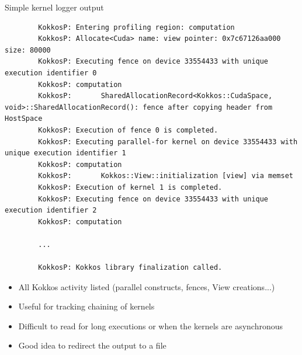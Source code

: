\documentclass[
    aspectratio=169,
]{beamer}
\begin{document}
\begin{frame}[fragile]{Simple kernel logger output}
    \begin{verbatim}
        KokkosP: Entering profiling region: computation
        KokkosP: Allocate<Cuda> name: view pointer: 0x7c67126aa000 size: 80000
        KokkosP: Executing fence on device 33554433 with unique execution identifier 0
        KokkosP: computation
        KokkosP:       SharedAllocationRecord<Kokkos::CudaSpace, void>::SharedAllocationRecord(): fence after copying header from HostSpace
        KokkosP: Execution of fence 0 is completed.
        KokkosP: Executing parallel-for kernel on device 33554433 with unique execution identifier 1
        KokkosP: computation
        KokkosP:       Kokkos::View::initialization [view] via memset
        KokkosP: Execution of kernel 1 is completed.
        KokkosP: Executing fence on device 33554433 with unique execution identifier 2
        KokkosP: computation

        ...

        KokkosP: Kokkos library finalization called.
    \end{verbatim}

    \begin{itemize}
        \item All Kokkos activity listed (parallel constructs, fences, View creations...)
        \item Useful for tracking chaining of kernels
        \item Difficult to read for long executions or when the kernels are asynchronous
        \item Good idea to redirect the output to a file
    \end{itemize}
\end{frame}
\end{document}
